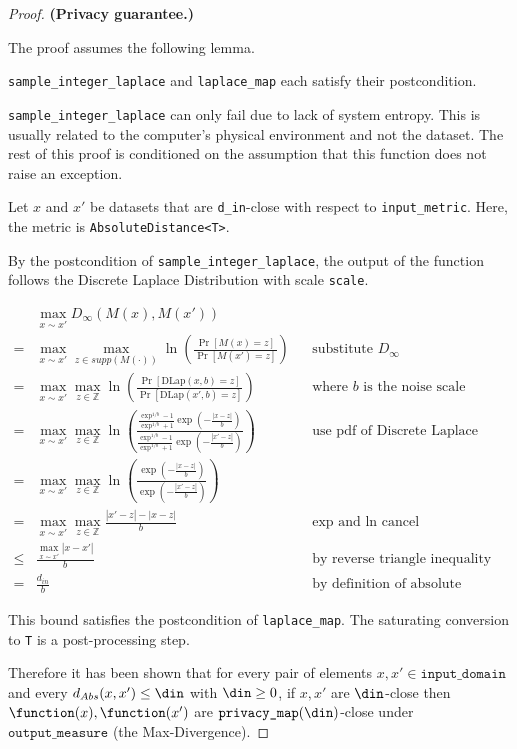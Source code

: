 \documentclass{article}
\begin{document}
\begin{proof} 
\textbf{(Privacy guarantee.)} 
    
\begin{tcolorbox}
    The proof assumes the following lemma.
    \begin{lemma}
        \texttt{sample\_integer\_laplace} and \texttt{laplace\_map} each satisfy their postcondition.
    \end{lemma}
\end{tcolorbox}

\texttt{sample\_integer\_laplace} can only fail due to lack of system entropy. 
This is usually related to the computer's physical environment and not the dataset. 
The rest of this proof is conditioned on the assumption that this function does not raise an exception. 

Let $x$ and $x'$ be datasets that are \texttt{d\_in}-close with respect to \texttt{input\_metric}.
Here, the metric is \texttt{AbsoluteDistance<T>}.

By the postcondition of \texttt{sample\_integer\_laplace},
the output of the function follows the Discrete Laplace Distribution with scale \texttt{scale}.

\begin{align*}
    & \max_{x \sim x'} D_{\infty}(M(x), M(x'))  \\
    =& \max_{x \sim x'} \max_{z \in supp(M(\cdot))} \ln\left(\frac{\Pr\left[M(x) = z\right]}{\Pr\left[M(x') = z \right]}\right)
        &&\text{substitute } D_{\infty}\\
    =& \max_{x \sim x'} \max_{z \in \mathbb{Z}} \ln\left(\frac{\Pr\left[\mathrm{DLap}(x, b) = z \right]}{\Pr\left[\mathrm{DLap}(x', b) = z\right]}\right)
        &&\text{where } b \text{ is the noise scale} \\
    =& \max_{x \sim x'} \max_{z \in \mathbb{Z}} \ln\left(\frac{
    \frac{\exp^{1/b} - 1}{\exp^{1/b} + 1} \exp \left( -\frac{|x - z|}{b} \right)
    }{
        \frac{\exp^{1/b} - 1}{\exp^{1/b} + 1} \exp \left( -\frac{|x' - z|}{b} \right)
    }\right) 
        &&\text{use pdf of Discrete Laplace} \\
    =& \max_{x \sim x'} \max_{z \in \mathbb{Z}} \ln\left(\frac{
    \exp \left( -\frac{|x - z|}{b} \right)
    }{
        \exp \left( -\frac{|x' - z|}{b} \right)
    }\right) \\
    =& \max_{x \sim x'} \max_{z \in \mathbb{Z}}\frac{|x' - z| - |x - z|}{b}&& \text{exp and ln cancel} \\
    \leq& \frac{\max_{x \sim x'} |x - x'|}{b} &&\text{by reverse triangle inequality} \\
    =& \frac{d_{in}}{b}  &&\text{by definition of absolute distance}
\end{align*}

This bound satisfies the postcondition of \texttt{laplace\_map}.
The saturating conversion to \texttt{T} is a post-processing step.

Therefore it has been shown that for every pair of elements $x, x' \in \texttt{input\_domain}$ and every $d_{Abs}(x, x') \le \din$ with $\din \ge 0$, 
if $x, x'$ are $\din$-close then $\function(x),\function(x')$ are $\texttt{privacy\_map}(\din)$-close under $\texttt{output\_measure}$ (the Max-Divergence).
\end{proof}
\end{document}
